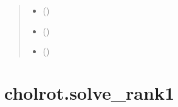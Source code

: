 \documentclass[a4paper,11pt,english]{sphinxmanual}
\begin{document}
\begin{fulllineitems}
\begin{quote}
\begin{description}
\begin{itemize}
\item {} 
\sphinxAtStartPar
{} ()

\item {} 
\sphinxAtStartPar
{} ()

\item {} 
\sphinxAtStartPar
{} ()

\end{itemize}

\sphinxAtStartPar
{}

\end{description}\end{quote}

\end{fulllineitems}


\sphinxstepscope


\section{cholrot.solve\_rank1}
\label{\detokenize{generated/cholrot.solve_rank1:cholrot-solve-rank1}}\label{\detokenize{generated/cholrot.solve_rank1::doc}}
\end{document}
